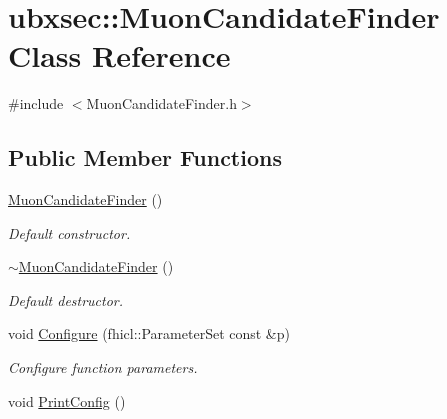 \hypertarget{classubxsec_1_1MuonCandidateFinder}{\section{ubxsec\-:\-:Muon\-Candidate\-Finder Class Reference}
\label{classubxsec_1_1MuonCandidateFinder}
}


{\ttfamily \#include $<$Muon\-Candidate\-Finder.\-h$>$}

\subsection*{Public Member Functions}
\begin{DoxyCompactItemize}
\item 
\hypertarget{classubxsec_1_1MuonCandidateFinder_a9de3c51ebc0c286e9185c954acd483ab}{\hyperlink{classubxsec_1_1MuonCandidateFinder_a9de3c51ebc0c286e9185c954acd483ab}{Muon\-Candidate\-Finder} ()}\label{classubxsec_1_1MuonCandidateFinder_a9de3c51ebc0c286e9185c954acd483ab}

\begin{DoxyCompactList}\small\item\em Default constructor. \end{DoxyCompactList}\item 
\hypertarget{classubxsec_1_1MuonCandidateFinder_a4a3e999574011fbdc477b28c50462b05}{\hyperlink{classubxsec_1_1MuonCandidateFinder_a4a3e999574011fbdc477b28c50462b05}{$\sim$\-Muon\-Candidate\-Finder} ()}\label{classubxsec_1_1MuonCandidateFinder_a4a3e999574011fbdc477b28c50462b05}

\begin{DoxyCompactList}\small\item\em Default destructor. \end{DoxyCompactList}\item 
\hypertarget{classubxsec_1_1MuonCandidateFinder_a5e9681aa566032e182bf377db9b02001}{void \hyperlink{classubxsec_1_1MuonCandidateFinder_a5e9681aa566032e182bf377db9b02001}{Configure} (fhicl\-::\-Parameter\-Set const \&p)}\label{classubxsec_1_1MuonCandidateFinder_a5e9681aa566032e182bf377db9b02001}

\begin{DoxyCompactList}\small\item\em Configure function parameters. \end{DoxyCompactList}\item 
\hypertarget{classubxsec_1_1MuonCandidateFinder_a1cb16460228f9ee74c8d41632a9f753d}{void \hyperlink{classubxsec_1_1MuonCandidateFinder_a1cb16460228f9ee74c8d41632a9f753d}{Print\-Config} ()}\label{classubxsec_1_1MuonCandidateFinder_a1cb16460228f9ee74c8d41632a9f753d}


\end{DoxyCompactItemize}
